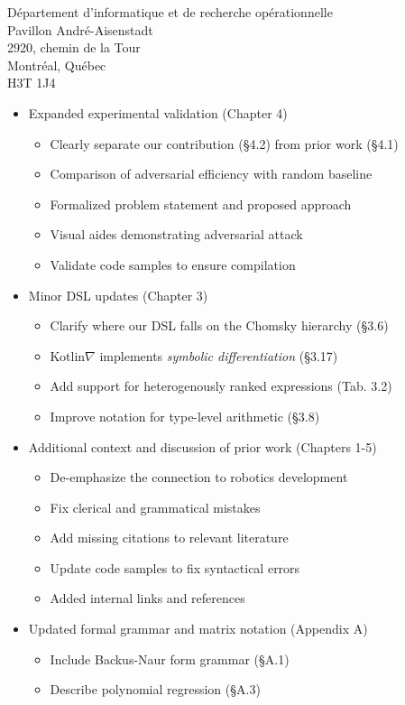 \documentclass{letter}
\begin{document}
\begin{letter}{D\'epartement d'informatique et de recherche op\'erationnelle \\ Pavillon Andr\'e-Aisenstadt \\ 2920, chemin de la Tour \\ Montr\'eal, Qu\'ebec \\ H3T 1J4}
        \begin{itemize}
            \item Expanded experimental validation (Chapter 4)
                \begin{itemize}
                    \item Clearly separate our contribution (\S 4.2) from prior work (\S 4.1)
                    \item Comparison of adversarial efficiency with random baseline
                    \item Formalized problem statement and proposed approach
                    \item Visual aides demonstrating adversarial attack
                    \item Validate code samples to ensure compilation
                \end{itemize}
            \item Minor DSL updates (Chapter 3)
                \begin{itemize}
                    \item Clarify where our DSL falls on the Chomsky hierarchy (\S 3.6)
                    \item Kotlin$\nabla$ implements \textit{symbolic differentiation} (\S 3.17)
                    \item Add support for heterogenously ranked expressions (Tab. 3.2)
                    \item Improve notation for type-level arithmetic (\S 3.8)
                \end{itemize}
            \item Additional context and discussion of prior work (Chapters 1-5)
                \begin{itemize}
                    \item De-emphasize the connection to robotics development
                    \item Fix clerical and grammatical mistakes
                    \item Add missing citations to relevant literature
                    \item Update code samples to fix syntactical errors
                    \item Added internal links and references
                \end{itemize}
            \item Updated formal grammar and matrix notation (Appendix A)
                \begin{itemize}
                    \item Include Backus-Naur form grammar (\S A.1)
                    \item Describe polynomial regression (\S A.3)
                \end{itemize}
        \end{itemize}


\end{letter}
\end{document}
